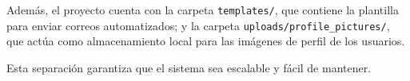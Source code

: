 Además, el proyecto cuenta con la carpeta \texttt{templates/}, que contiene la plantilla para enviar correos automatizados; y la carpeta \texttt{uploads/profile\_pictures/}, que actúa como almacenamiento local para las imágenes de perfil de los usuarios.


Esta separación garantiza que el sistema sea escalable y fácil de mantener.